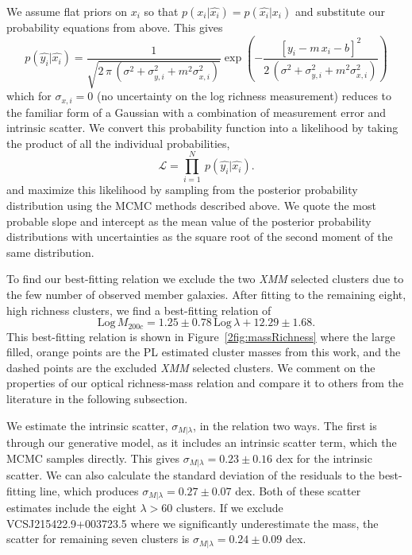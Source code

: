 We assume flat priors on $x_i$ so that $p(x_i|\hat{x_i}) = p(\hat{x_i}|x_i)$ and substitute our probability equations from above. This gives
\begin{equation}
	p(\hat{y_i}|\hat{x_i}) = 
	\frac{1}{\sqrt{2\,\pi\,(\sigma^2 + \sigma_{y,i}^2 + m^2\sigma_{x,i}^2)}}\exp\left(-\frac{[y_i - m\,x_i - b]^2}{2\,(\sigma^2 + \sigma_{y,i}^2 + m^2\sigma_{x,i}^2)}\right)
\end{equation}
which for $\sigma_{x,i}=0$ (no uncertainty on the log richness measurement) reduces to the familiar form of a Gaussian with a combination of measurement error and intrinsic scatter. We convert this probability function into a likelihood by taking the product of all the individual probabilities,  
\begin{equation}\label{2eq:like}
\mathscr{L} = \prod_{i=1}^N \ p(\hat{y_i}|\hat{x_i}).
\end{equation}
and maximize this likelihood by sampling from the posterior probability distribution using the MCMC methods described above. We quote the most probable slope and intercept as the mean value of the posterior probability distributions with uncertainties as the square root of the second moment of the same distribution.

To find our best-fitting relation we exclude the two \emph{XMM} selected clusters due to the few number of observed member galaxies. After fitting to the remaining eight, high richness clusters, we find a best-fitting relation of 
\begin{equation}\label{2eq: best fit}
 \mathrm{Log}\,M_{200c}=1.25\pm{0.78}\, \mathrm{Log}\,\lambda + 12.29\pm{1.68}. 
\end{equation}
This best-fitting relation is shown in Figure~\ref{2fig:massRichness} where the large filled, orange points are the PL estimated cluster masses from this work, and the dashed points are the excluded \emph{XMM} selected clusters. We comment on the properties of our optical richness-mass relation and compare it to others from the literature in the following subsection.

We estimate the intrinsic scatter, $\sigma_{M|\lambda}$, in the relation two ways. The first is through our generative model, as it includes an intrinsic scatter term, which the MCMC samples directly. This gives $\sigma_{M|\lambda} = 0.23\pm0.16$ dex for the intrinsic scatter. We can also calculate the standard deviation of the residuals to the best-fitting line, which produces $\sigma_{M|\lambda} = 0.27\pm0.07$ dex. Both of these scatter estimates include the eight $\lambda > 60$ clusters. If we exclude VCSJ215422.9+003723.5 where we significantly underestimate the mass, the scatter for remaining seven clusters is $\sigma_{M|\lambda} = 0.24\pm0.09$ dex.

